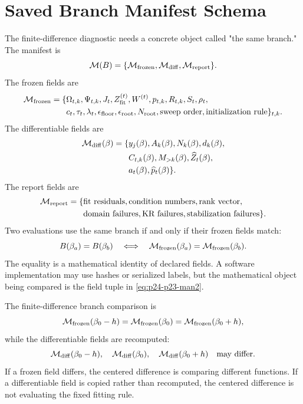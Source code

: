 \documentclass[11pt]{article}
\begin{document}
\section{Saved Branch Manifest Schema}

The finite-difference diagnostic needs a concrete object called "the same
branch."  The manifest is
\[
    \mathcal M(B)
    =
    \{\mathcal M_{\rm frozen},\mathcal M_{\rm diff},\mathcal M_{\rm report}\}.
    \label{eq:p24-p23-man1}
\]
The frozen fields are
\[
\begin{aligned}
    \mathcal M_{\rm frozen}
    =
    \{&
    \Omega_{t,k},\Psi_{t,k},J_t,
    Z_{\rm fit}^{(t)},W^{(t)},p_{t,k},R_{t,k},
    S_t,\rho_t,\\
    &c_t,\tau_t,\lambda_t,\epsilon_{\rm floor},
    \epsilon_{\rm root},N_{\rm root},
    \text{sweep order},\text{initialization rule}\}_{t,k}.
\end{aligned}
    \label{eq:p24-p23-man2}
\]
The differentiable fields are
\[
    \begin{aligned}
    \mathcal M_{\rm diff}(\beta)
    =
    \{&
    y_j(\beta),A_k(\beta),N_k(\beta),d_k(\beta),\\
    &C_{t,k}(\beta),M_{>k}(\beta),\widehat Z_t(\beta),\\
    &a_t(\beta),\widehat p_t(\beta)\}.
    \end{aligned}
    \label{eq:p24-p23-man3}
\]
The report fields are
\[
    \begin{aligned}
    \mathcal M_{\rm report}
    =
    \{&
    \text{fit residuals},\text{condition numbers},\text{rank vector},\\
    &\text{domain failures},\text{KR failures},
      \text{stabilization failures}\}.
    \end{aligned}
    \label{eq:p24-p23-man4}
\]
Two evaluations use the same branch if and only if their frozen fields match:
\[
    B(\beta_a)=B(\beta_b)
    \quad\Longleftrightarrow\quad
    \mathcal M_{\rm frozen}(\beta_a)=\mathcal M_{\rm frozen}(\beta_b).
    \label{eq:p24-p23-man5}
\]
The equality is a mathematical identity of declared fields.  A software
implementation may use hashes or serialized labels, but the mathematical
object being compared is the field tuple in \eqref{eq:p24-p23-man2}.

The finite-difference branch comparison is
\[
    \mathcal M_{\rm frozen}(\beta_0-h)
    =
    \mathcal M_{\rm frozen}(\beta_0)
    =
    \mathcal M_{\rm frozen}(\beta_0+h),
    \label{eq:p24-p23-man6}
\]
while the differentiable fields are recomputed:
\[
    \mathcal M_{\rm diff}(\beta_0-h),
    \quad
    \mathcal M_{\rm diff}(\beta_0),
    \quad
    \mathcal M_{\rm diff}(\beta_0+h)
    \quad
    \text{may differ.}
    \label{eq:p24-p23-man7}
\]
If a frozen field differs, the centered difference is comparing different
functions.  If a differentiable field is copied rather than recomputed, the
centered difference is not evaluating the fixed fitting rule.
\end{document}
